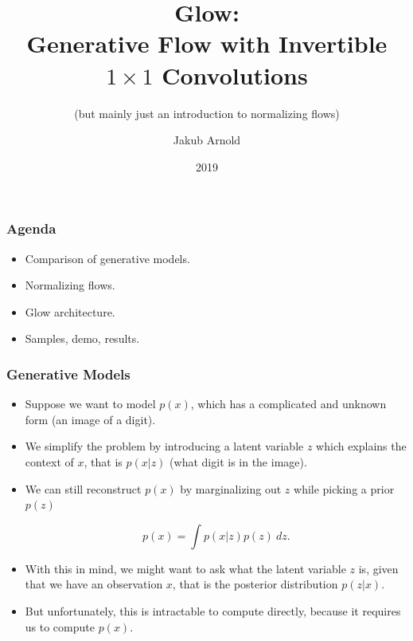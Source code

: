 \documentclass{beamer}
\title{Glow:\\ Generative Flow with Invertible $1\times1$ Convolutions}
\subtitle{(but mainly just an introduction to normalizing flows)}
\author{Jakub Arnold}
\date{2019}
\begin{document}
\frame{\titlepage}

\begin{frame}
  \frametitle{Agenda}

  \begin{itemize}
    \item Comparison of generative models.
    \item Normalizing flows.
    \item Glow architecture.
    \item Samples, demo, results.
  \end{itemize}
\end{frame}

\begin{frame}

  \frametitle{Generative Models}

  \begin{itemize}
    \item Suppose we want to model $p(x)$, which has a complicated and
      unknown form (an image of a digit).

    \item We simplify the problem by introducing a latent variable $z$ which
      explains the context of $x$, that is $p(x | z)$ (what digit is in the image).

    \item We can still reconstruct $p(x)$ by marginalizing out $z$ while
      picking a prior $p(z)$

      \[
        p(x) = \int p(x | z) p(z)\ dz.
      \]

    \item With this in mind, we might want to ask what the latent variable
      $z$ is, given that we have an observation $x$, that is the posterior
      distribution $p(z | x)$.

    \item But unfortunately, this is intractable to compute directly, because
      it requires us to compute $p(x)$.


  \end{itemize}

\end{frame}
\end{document}
